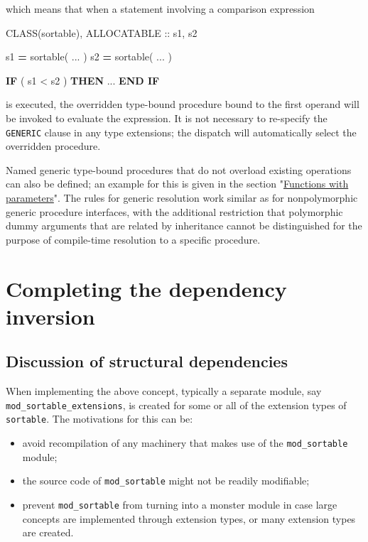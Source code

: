 \documentclass[]{scrartcl}
\newenvironment{Shaded}{}{}
\newcommand{\DataTypeTok}[1]{\textcolor[rgb]{0.56,0.13,0.00}{#1}}
\newcommand{\KeywordTok}[1]{\textcolor[rgb]{0.00,0.44,0.13}{\textbf{#1}}}
\newcommand{\NormalTok}[1]{#1}
\newcommand{\OperatorTok}[1]{\textcolor[rgb]{0.40,0.40,0.40}{#1}}
\providecommand{\tightlist}{%
  \setlength{\itemsep}{0pt}\setlength{\parskip}{0pt}}
\begin{document}
which means that when a statement involving a comparison expression

\begin{Shaded}
\begin{Highlighting}[]
\DataTypeTok{CLASS(sortable)}\NormalTok{, }\DataTypeTok{ALLOCATABLE} \DataTypeTok{::}\NormalTok{ s1, s2}

\NormalTok{s1 }\KeywordTok{=}\NormalTok{ sortable( ... )}
\NormalTok{s2 }\KeywordTok{=}\NormalTok{ sortable( ... )}

\KeywordTok{IF}\NormalTok{ ( s1 }\OperatorTok{\textless{}}\NormalTok{ s2 ) }\KeywordTok{THEN}
\NormalTok{   ...}
\KeywordTok{END IF}
\end{Highlighting}
\end{Shaded}

is executed, the overridden type-bound procedure bound to the first
operand will be invoked to evaluate the expression. It is not necessary
to re-specify the \texttt{GENERIC} clause in any type extensions; the
dispatch will automatically select the overridden procedure.

Named generic type-bound procedures that do not overload existing
operations can also be defined; an example for this is given in the
section
"\href{https://en.wikipedia.org/wiki/User:RBaSc/draft_ftnoo\#Functions_with_parameters}{Functions
with parameters}". The rules for generic resolution work similar as for
nonpolymorphic generic procedure interfaces, with the additional
restriction that polymorphic dummy arguments that are related by
inheritance cannot be distinguished for the purpose of compile-time
resolution to a specific procedure.

\section{Completing the dependency
inversion}\label{completing-the-dependency-inversion}

\subsection{Discussion of structural
dependencies}\label{discussion-of-structural-dependencies}

When implementing the above concept, typically a separate module, say
\texttt{mod\_sortable\_extensions}, is created for some or all of the
extension types of \texttt{sortable}. The motivations for this can be:

\begin{itemize}
\tightlist
\item
  avoid recompilation of any machinery that makes use of the
  \texttt{mod\_sortable} module;
\item
  the source code of \texttt{mod\_sortable} might not be readily
  modifiable;
\item
  prevent \texttt{mod\_sortable} from turning into a monster module in
  case large concepts are implemented through extension types, or many
  extension types are created.
\end{itemize}
\end{document}
